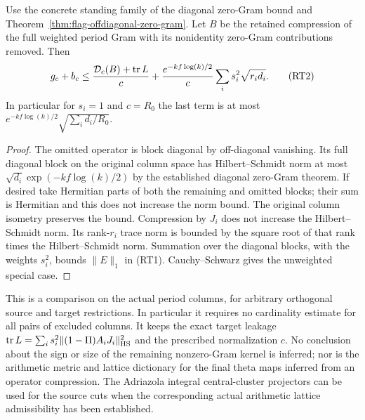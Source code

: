 \begin{corollary}
\label{cor:retained-zero-gram-cost}
Use the concrete standing family of the diagonal zero-Gram
bound and Theorem~\ref{thm:flag-offdiagonal-zero-gram}.
Let \(B\) be the retained compression of the full weighted
period Gram with its nonidentity zero-Gram contributions
removed. Then
\[
 g_c+b_c\le
 \frac{{\cal D}_c(B)+\operatorname{tr}L}{c}
 +\frac{e^{-kf\log(k)/2}}c\sum_i s_i^2\sqrt{r_i d_i}.
 \tag{RT2}
\]
In particular for \(s_i=1\) and \(c=R_0\) the last term is
at most
\(e^{-kf\log(k)/2}\sqrt{\sum_i d_i/R_0}\).
\end{corollary}
\begin{proof}
The omitted operator is block diagonal by off-diagonal
vanishing. Its full diagonal block on the original column
space has Hilbert--Schmidt norm at most
\(\sqrt{d_i}\exp(-kf\log(k)/2)\) by the established
diagonal zero-Gram theorem. If desired take Hermitian
parts of both the remaining and omitted blocks; their sum
is Hermitian and this does not increase the norm bound.
The original column isometry preserves the bound.
Compression by \(J_i\) does not increase the
Hilbert--Schmidt norm. Its rank-\(r_i\) trace norm is
bounded by the square root of that rank times the
Hilbert--Schmidt norm. Summation over the diagonal blocks,
with the weights \(s_i^2\), bounds \(\|E\|_1\) in (RT1).
Cauchy--Schwarz gives the unweighted special case.
\end{proof}

This is a comparison on the actual period columns, for arbitrary
orthogonal source and target restrictions. In particular it requires
no cardinality estimate for all pairs of excluded columns.
It keeps the exact target leakage
\(\operatorname{tr}L=\sum_i s_i^2\|(1-\Pi)A_iJ_i\|_{\rm HS}^2\)
and the prescribed normalization \(c\).
No conclusion about the sign or size of the remaining nonzero-Gram
kernel is inferred; nor is the arithmetic metric and lattice
dictionary for the final theta maps inferred from an operator
compression. The Adriazola integral central-cluster projectors
can be used for the source cuts when the corresponding actual
arithmetic lattice admissibility has been established.
